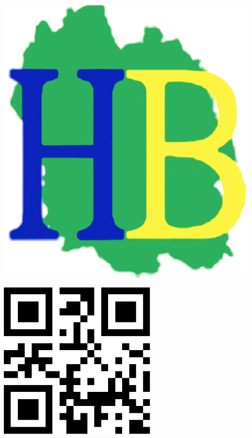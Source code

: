 \documentclass[a4paper,11pt,fleqn]{article}
\begin{document}
\Huge

\begin{block} %
{}\hfill {}
{}\hfill {}
\begin{minipage}{0.15\linewidth}
\includegraphics[width=\textwidth]{../logo-HB.png}
\end{minipage}
{}\hfill {}



\begin{minipage}{0.48\linewidth}
\includegraphics[width=8cm]{./1.pdf}
\end{minipage}
\begin{minipage}{0.5\linewidth}
{}\hfill {}
{}\hfill {}
\end{minipage}



\end{block}
\end{document}
